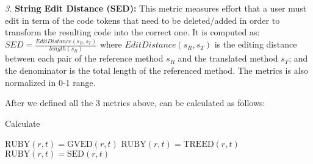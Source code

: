 \emph{3.} \textbf{String Edit Distance (SED):} This metric measures
effort that a user must edit in term of the code tokens
that need to be deleted/added in order to transform the
resulting code into the correct one. It is computed as:  $SED = \frac{EditDistance\left(s_R, s_T\right)}{length\left(s_R\right)}$ where $EditDistance\left(s_R, s_T\right)$ is the editing distance between each pair of the reference method $s_R$ and the translated method $s_T$; and the denominator is the total length of the referenced method. The metrics is also normalized in 0-1 range. 

After we defined all the 3 metrics above, {\model} can be calculated as follows: 


\makeatletter
\def\BState{\State\hskip-\ALG@thistlm}
\makeatother
\begin{algorithm}
\caption{Calculate {\model}}\label{euclid}
\begin{algorithmic}[1]
\State $\mbox{RUBY}\left(r,t\right) = \mbox{GVED}\left(r,t\right) $
\State $\mbox{RUBY}\left(r,t\right) = \mbox{TREED}\left(r,t\right) $
\Else 
\State $\mbox{RUBY}\left(r,t\right) = \mbox{SED}\left(r,t\right) $
\EndIf
\end{algorithmic}
\end{algorithm}
